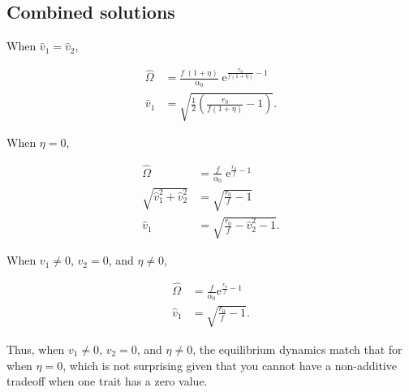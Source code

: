 \subsection*{Combined solutions}

When $\hat{v}_1 = \hat{v}_2$,

\begin{equation}  \label{eq:two-traits-finals-eta-negative}
\begin{split}
    \hat{\Omega} &= \frac{ f \; ( 1 + \eta ) }{ \alpha_0 } \;
        \textrm{e}^{\frac{  r_0 }{ f ( 1 + \eta ) } - 1 }
        \\
    \hat{v}_1 &= \sqrt{
        \frac{1}{2} \left( \frac{ r_0 }{ f (1 + \eta) } - 1 \right)
    }
    \textrm{.}
\end{split}
\end{equation}


\noindent When $\eta = 0$,

\begin{equation}  \label{eq:two-traits-finals-eta-zero}
\begin{split}
    \hat{\Omega} &= \frac{ f }{ \alpha_0 } \; \textrm{e}^{\frac{ r_0 }{ f } - 1 } \\
    \sqrt{\hat{v}_1^2 + \hat{v}_2^2} &= \sqrt{ \frac{ r_0 }{ f } - 1 } \\
    \hat{v}_1 &= \sqrt{ \frac{ r_0  }{ f } - \hat{v}_2^2 - 1 }
    \textrm{.}
\end{split}
\end{equation}


\noindent When $v_1 \ne 0$, $v_2 = 0$, and $\eta \ne 0$,

\begin{equation}  \label{eq:two-traits-finals-eta-positive}
\begin{split}
    \hat{\Omega} &= \frac{f}{\alpha_0} \textrm{e}^{\frac{r_0}{f} - 1} \\
    \hat{v}_1 &= \sqrt{ \frac{ r_0 }{ f } - 1 }
    \textrm{.}
\end{split}
\end{equation}

\noindent Thus, when $v_1 \ne 0$, $v_2 = 0$, and $\eta \ne 0$, the equilibrium
dynamics match that for when $\eta = 0$, which is not surprising given that
you cannot have a non-additive tradeoff when one trait has a zero value.

















